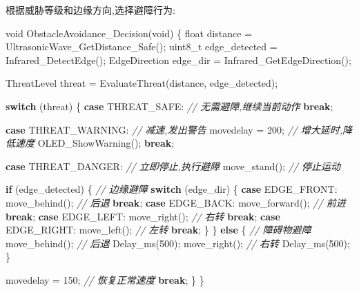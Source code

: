\documentclass[
]{article}
\newenvironment{Shaded}{}{}
\newcommand{\CommentTok}[1]{\textcolor[rgb]{0.38,0.63,0.69}{\textit{#1}}}
\newcommand{\ControlFlowTok}[1]{\textcolor[rgb]{0.00,0.44,0.13}{\textbf{#1}}}
\newcommand{\DataTypeTok}[1]{\textcolor[rgb]{0.56,0.13,0.00}{#1}}
\newcommand{\DecValTok}[1]{\textcolor[rgb]{0.25,0.63,0.44}{#1}}
\newcommand{\NormalTok}[1]{#1}
\begin{document}
根据威胁等级和边缘方向,选择避障行为:

\begin{Shaded}
\begin{Highlighting}[]
\DataTypeTok{void}\NormalTok{ ObstacleAvoidance\_Decision(}\DataTypeTok{void}\NormalTok{)}
\NormalTok{\{}
    \DataTypeTok{float}\NormalTok{ distance = UltrasonicWave\_GetDistance\_Safe();}
    \DataTypeTok{uint8\_t}\NormalTok{ edge\_detected = Infrared\_DetectEdge();}
\NormalTok{    EdgeDirection edge\_dir = Infrared\_GetEdgeDirection();}
    
\NormalTok{    ThreatLevel threat = EvaluateThreat(distance, edge\_detected);}
    
    \ControlFlowTok{switch}\NormalTok{ (threat) \{}
        \ControlFlowTok{case}\NormalTok{ THREAT\_SAFE:}
            \CommentTok{// 无需避障,继续当前动作}
            \ControlFlowTok{break}\NormalTok{;}
            
        \ControlFlowTok{case}\NormalTok{ THREAT\_WARNING:}
            \CommentTok{// 减速,发出警告}
\NormalTok{            movedelay = }\DecValTok{200}\NormalTok{;  }\CommentTok{// 增大延时,降低速度}
\NormalTok{            OLED\_ShowWarning();}
            \ControlFlowTok{break}\NormalTok{;}
            
        \ControlFlowTok{case}\NormalTok{ THREAT\_DANGER:}
            \CommentTok{// 立即停止,执行避障}
\NormalTok{            move\_stand();  }\CommentTok{// 停止运动}
            
            \ControlFlowTok{if}\NormalTok{ (edge\_detected) \{}
                \CommentTok{// 边缘避障}
                \ControlFlowTok{switch}\NormalTok{ (edge\_dir) \{}
                    \ControlFlowTok{case}\NormalTok{ EDGE\_FRONT:}
\NormalTok{                        move\_behind();  }\CommentTok{// 后退}
                        \ControlFlowTok{break}\NormalTok{;}
                    \ControlFlowTok{case}\NormalTok{ EDGE\_BACK:}
\NormalTok{                        move\_forward();  }\CommentTok{// 前进}
                        \ControlFlowTok{break}\NormalTok{;}
                    \ControlFlowTok{case}\NormalTok{ EDGE\_LEFT:}
\NormalTok{                        move\_right();  }\CommentTok{// 右转}
                        \ControlFlowTok{break}\NormalTok{;}
                    \ControlFlowTok{case}\NormalTok{ EDGE\_RIGHT:}
\NormalTok{                        move\_left();  }\CommentTok{// 左转}
                        \ControlFlowTok{break}\NormalTok{;}
\NormalTok{                \}}
\NormalTok{            \} }\ControlFlowTok{else}\NormalTok{ \{}
                \CommentTok{// 障碍物避障}
\NormalTok{                move\_behind();  }\CommentTok{// 后退}
\NormalTok{                Delay\_ms(}\DecValTok{500}\NormalTok{);}
\NormalTok{                move\_right();  }\CommentTok{// 右转}
\NormalTok{                Delay\_ms(}\DecValTok{500}\NormalTok{);}
\NormalTok{            \}}
            
\NormalTok{            movedelay = }\DecValTok{150}\NormalTok{;  }\CommentTok{// 恢复正常速度}
            \ControlFlowTok{break}\NormalTok{;}
\NormalTok{    \}}
\NormalTok{\}}
\end{Highlighting}
\end{Shaded}
\end{document}
